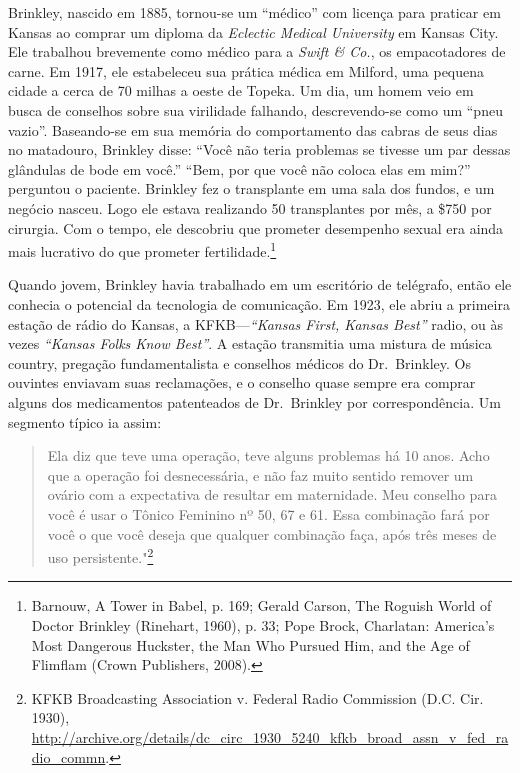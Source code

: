 \documentclass{book}
\newcommand{\ingles}[1]{\textit{#1}}
\begin{document}
Brinkley, nascido em 1885, tornou-se um ``médico'' com licença para praticar em
Kansas ao comprar um diploma da \ingles{Eclectic Medical University} em Kansas
City. Ele trabalhou brevemente como médico para a \ingles{Swift \& Co.}, os
empacotadores de carne. Em 1917, ele estabeleceu sua prática médica em Milford,
uma pequena cidade a cerca de 70 milhas a oeste de Topeka. Um dia, um homem veio
em busca de conselhos sobre sua virilidade falhando, descrevendo-se como um ``pneu
vazio''. Baseando-se em sua memória do comportamento das cabras de seus dias no
matadouro, Brinkley disse: ``Você não teria problemas se tivesse um par dessas
glândulas de bode em você.'' ``Bem, por que você não coloca elas em mim?'' perguntou
o paciente. Brinkley fez o transplante em uma sala dos fundos, e um negócio nasceu.
Logo ele estava realizando 50 transplantes por mês, a \$750 por cirurgia. Com o
tempo, ele descobriu que prometer desempenho sexual era ainda mais lucrativo do
que prometer fertilidade.\footnote{Barnouw, A Tower in Babel, p. 169; Gerald Carson,
The Roguish World of Doctor Brinkley (Rinehart, 1960), p. 33; Pope Brock, Charlatan:
America's Most Dangerous Huckster, the Man Who Pursued Him, and the Age of Flimflam
(Crown Publishers, 2008).}

Quando jovem, Brinkley havia trabalhado em um escritório de telégrafo, então ele
conhecia o potencial da tecnologia de comunicação. Em 1923, ele abriu a primeira
estação de rádio do Kansas, a KFKB---\ingles{``Kansas First, Kansas Best''} radio,
ou às vezes \ingles{``Kansas Folks Know Best''}. A estação transmitia uma mistura
de música country, pregação fundamentalista e conselhos médicos do Dr.~Brinkley.
Os ouvintes enviavam suas reclamações, e o conselho quase sempre era comprar alguns
dos medicamentos patenteados de Dr.~Brinkley por correspondência. Um segmento típico
ia assim:

\begin{quote}
    Ela diz que teve uma operação, teve alguns problemas há 10 anos. Acho que
    a operação foi desnecessária, e não faz muito sentido remover um ovário com
    a expectativa de resultar em maternidade. Meu conselho para você é usar o
    Tônico Feminino nº 50, 67 e 61. Essa combinação fará por você o que você
    deseja que qualquer combinação faça, após três meses de uso persistente."\footnote{KFKB
    Broadcasting Association v. Federal Radio Commission (D.C. Cir. 1930),
    \url{http://archive.org/details/dc_circ_1930_5240_kfkb_broad_assn_v_fed_radio_commn}.}
\end{quote}
\end{document}
